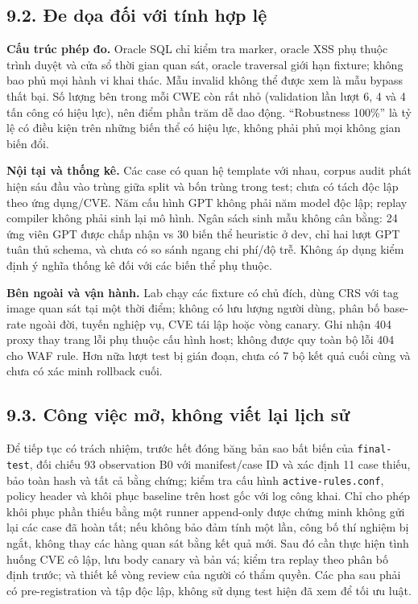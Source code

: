 \documentclass[
  10pt,
  a4paper,
]{article}
\begin{document}
\subsection{9.2. Đe dọa đối với tính hợp
lệ}\label{ux111e-dux1ecda-ux111ux1ed1i-vux1edbi-tuxednh-hux1ee3p-lux1ec7}

\textbf{Cấu trúc phép đo.} Oracle SQL chỉ kiểm tra marker, oracle XSS
phụ thuộc trình duyệt và cửa sổ thời gian quan sát, oracle traversal
giới hạn fixture; không bao phủ mọi hành vi khai thác. Mẫu invalid không
thể được xem là mẫu bypass thất bại. Số lượng bên trong mỗi CWE còn rất
nhỏ (validation lần lượt 6, 4 và 4 tấn công có hiệu lực), nên điểm phần
trăm dễ dao động. ``Robustness 100\%'' là tỷ lệ có điều kiện trên những
biến thể có hiệu lực, không phải phủ mọi không gian biến đổi.

\textbf{Nội tại và thống kê.} Các case có quan hệ template với nhau,
corpus audit phát hiện sáu đầu vào trùng giữa split và bốn trùng trong
test; chưa có tách độc lập theo ứng dụng/CVE. Năm cấu hình GPT không
phải năm model độc lập; replay compiler không phải sinh lại mô hình.
Ngân sách sinh mẫu không cân bằng: 24 ứng viên GPT được chấp nhận vs 30
biến thể heuristic ở dev, chỉ hai lượt GPT tuân thủ schema, và chưa có
so sánh ngang chi phí/độ trễ. Không áp dụng kiểm định ý nghĩa thống kê
đối với các biến thể phụ thuộc.

\textbf{Bên ngoài và vận hành.} Lab chạy các fixture có chủ đích, dùng
CRS với tag image quan sát tại một thời điểm; không có lưu lượng người
dùng, phân bố base-rate ngoài đời, tuyến nghiệp vụ, CVE tái lập hoặc
vòng canary. Ghi nhận 404 proxy thay trang lỗi phụ thuộc cấu hình host;
không được quy toàn bộ lỗi 404 cho WAF rule. Hơn nữa lượt test bị gián
đoạn, chưa có 7 bộ kết quả cuối cùng và chưa có xác minh rollback cuối.

\subsection{9.3. Công việc mở, không viết lại lịch
sử}\label{cuxf4ng-viux1ec7c-mux1edf-khuxf4ng-viux1ebft-lux1ea1i-lux1ecbch-sux1eed}

Để tiếp tục có trách nhiệm, trước hết đóng băng bản sao bất biến của
\texttt{final-test}, đối chiếu 93 observation B0 với manifest/case ID và
xác định 11 case thiếu, bảo toàn hash và tất cả bằng chứng; kiểm tra cấu
hình \texttt{active-rules.conf}, policy header và khôi phục baseline
trên host gốc với log công khai. Chỉ cho phép khôi phục phần thiếu bằng
một runner append-only được chứng minh không gửi lại các case đã hoàn
tất; nếu không bảo đảm tính một lần, công bố thí nghiệm bị ngắt, không
thay các hàng quan sát bằng kết quả mới. Sau đó cần thực hiện tình huống
CVE cô lập, lưu body canary và bản vá; kiểm tra replay theo phân bố định
trước; và thiết kế vòng review của người có thẩm quyền. Các pha sau phải
có pre-registration và tập độc lập, không sử dụng test hiện đã xem để
tối ưu luật.
\end{document}
